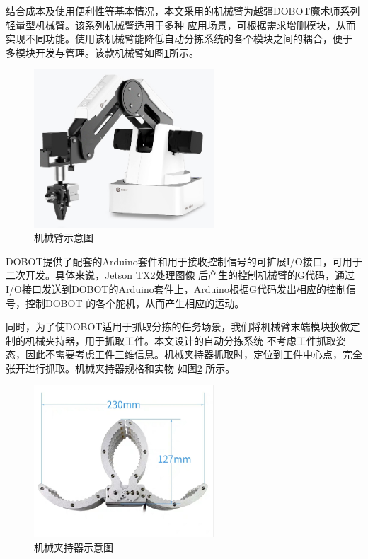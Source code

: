 结合成本及使用便利性等基本情况，本文采用的机械臂为越疆DOBOT魔术师系列轻量型机械臂。该系列机械臂适用于多种
应用场景，可根据需求增删模块，从而实现不同功能。使用该机械臂能降低自动分拣系统的各个模块之间的耦合，便于
多模块开发与管理。该款机械臂如图\ref{fig:robot}所示。

\begin{figure}[h]
    \centering
    \includegraphics[width=0.6\textwidth]{pic/chap2/robot.jpg}
    \caption{机械臂示意图}
    \label{fig:robot}
\end{figure}

DOBOT提供了配套的Arduino套件和用于接收控制信号的可扩展I/O接口，可用于二次开发。具体来说，Jetson TX2处理图像
后产生的控制机械臂的G代码，通过I/O接口发送到DOBOT的Arduino套件上，Arduino根据G代码发出相应的控制信号，控制DOBOT
的各个舵机，从而产生相应的运动。

同时，为了使DOBOT适用于抓取分拣的任务场景，我们将机械臂末端模块换做定制的机械夹持器，用于抓取工件。本文设计的自动分拣系统
不考虑工件抓取姿态，因此不需要考虑工件三维信息。机械夹持器抓取时，定位到工件中心点，完全张开进行抓取。机械夹持器规格和实物
如图\ref{fig:grip} 所示。

\begin{figure}[h]
    \centering
    \includegraphics[width=0.6\textwidth]{pic/chap2/grip.png}
    \caption{机械夹持器示意图}
    \label{fig:grip}
\end{figure}


